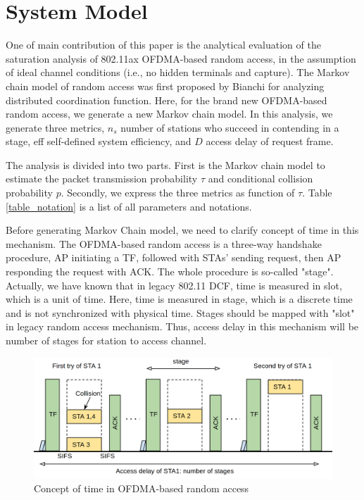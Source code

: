 \chapter{System Model} 		\label{chp_sys_model}
One of main contribution of this paper is the analytical evaluation of the saturation analysis of 802.11ax OFDMA-based random access, in the assumption of ideal channel conditions (i.e., no hidden terminals and capture). 
The Markov chain model of random access was first proposed by Bianchi for analyzing distributed coordination function\cite{bianchi2000performance}. 
Here, for the brand new OFDMA-based random access, we generate a new Markov chain model. 
In this analysis, we generate three metrics, $n_s$ number of stations who succeed in contending in a stage, eff self-defined system efficiency, and $D$ access delay of request frame. 

The analysis is divided into two parts. First is the Markov chain model to estimate the packet transmission probability $\tau$ and conditional collision probability $p$. 
Secondly, we express the three metrics as function of $\tau$. 
Table \ref{table_notation} is a list of all parameters and notations.

Before generating Markov Chain model, we need to clarify concept of time in this mechanism.
The OFDMA-based random access is a three-way handshake procedure, AP initiating a TF, followed with STAs' sending request, then AP responding the request with ACK.
The whole procedure is so-called "stage".
Actually, we have known that in legacy 802.11 DCF, time is measured in slot, which is a unit of time.
Here, time is measured in stage, which is a discrete time and is not synchronized with physical time. 
Stages should be mapped with "slot" in legacy random access mechanism.
Thus, access delay in this mechanism will be number of stages for station to access channel.

\begin{figure}[!t]
\centering
\includegraphics[scale=0.27]{./figure/chp3/ra_time.png}
\caption{Concept of time in OFDMA-based random access}
\label{fig_ra_time}
\end{figure}



